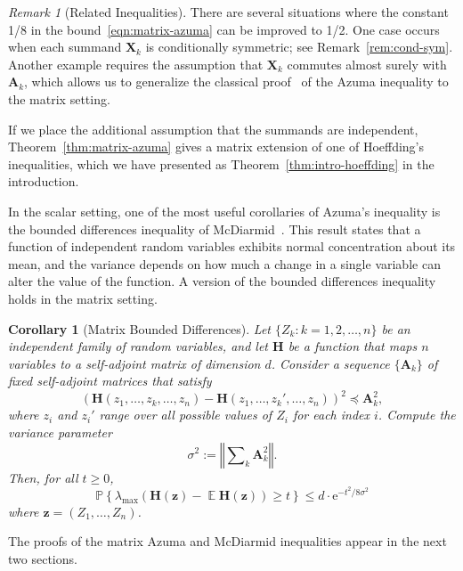 \documentclass[11pt,letterpaper,twoside,reqno,draft]{amsart}
\newtheorem{cor}[thm]{Corollary}
\theoremstyle{remark}
\newtheorem{rem}[thm]{Remark}
\numberwithin{equation}{section}
\numberwithin{thm}{section}
\begin{document}
\begin{rem}[Related Inequalities]
There are several situations where the constant 1/8 in the bound~\eqref{eqn:matrix-azuma} can be improved to 1/2.  One case occurs when each summand ${\bm{{X}}}_k$ is conditionally symmetric; see Remark~\ref{rem:cond-sym}.  Another example requires the assumption that ${\bm{{X}}}_k$ commutes almost surely with ${\bm{{A}}}_k$, which allows us to generalize the classical proof~\cite[Lem.~2.6]{McD98:Concentration} of the Azuma inequality to the matrix setting.

If we place the additional assumption that the summands are independent, Theorem~\ref{thm:matrix-azuma} gives a matrix extension of one of Hoeffding's inequalities, which we have presented as Theorem~\ref{thm:intro-hoeffding} in the introduction.  
\end{rem}

In the scalar setting, one of the most useful corollaries of Azuma's inequality is the bounded differences inequality of McDiarmid~\cite[Thm.~3.1]{McD98:Concentration}.  This result states that a function of independent random variables exhibits normal concentration about its mean, and the variance depends on how much a change in a single variable can alter the value of the function.  A version of the bounded differences inequality holds in the matrix setting.

\begin{cor}[Matrix Bounded Differences] \label{cor:mcdiarmid}
Let $\{ Z_k : k = 1, 2, \dots, n \}$ be an independent family of random variables, and let ${\bm{{H}}}$ be a function that maps $n$ variables to a self-adjoint matrix of dimension $d$.  Consider a sequence $\{{\bm{{A}}}_k\}$ of fixed self-adjoint matrices that satisfy
$$
\left( {\bm{{H}}}(z_1, \dots, z_k, \dots, z_n) - {\bm{{H}}}(z_1, \dots, z_k', \dots, z_n ) \right)^2 {\preccurlyeq} {\bm{{A}}}_k^2,
$$
where $z_i$ and $z_i'$ range over all possible values of $Z_i$ for each index $i$.  Compute the variance parameter
$$
\sigma^2 := {\left\Vert {{ \sum\nolimits_k {\bm{{A}}}_k^2 }} \right\Vert}.
$$
Then, for all $t \geq 0$,
$$
{\mathbb{P}\left\{ {{ \lambda_{\max}( {\bm{{H}}}({\bm{{z}}}) - {\operatorname{\mathbb{E}}} {\bm{{H}}}({\bm{{z}}}) ) \geq t }} \right\}}
	\leq d \cdot {\mathrm{e}}^{-t^2/8\sigma^2}
$$
where ${\bm{{z}}} = (Z_1, \dots, Z_n)$.
\end{cor}

The proofs of the matrix Azuma and McDiarmid inequalities appear in the next two sections.
\end{document}
